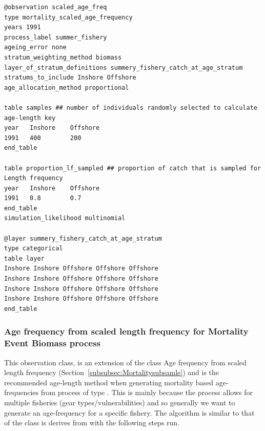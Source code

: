 {\small{\begin{verbatim}
@observation scaled_age_freq
type mortality_scaled_age_frequency
years 1991
process_label summer_fishery
ageing_error none
stratum_weighting_method biomass
layer_of_stratum_definitions summery_fishery_catch_at_age_stratum
stratums_to_include Inshore Offshore
age_allocation_method proportional

table samples ## number of individuals randomly selected to calculate age-length key
year   Inshore    Offshore
1991   400        200
end_table

table proportion_lf_sampled ## proportion of catch that is sampled for Length frequency
year   Inshore    Offshore
1991   0.8        0.7
end_table
simulation_likelihood multinomial

@layer summery_fishery_catch_at_age_stratum
type categorical
table layer 
Inshore Inshore Offshore Offshore Offshore
Inshore Inshore Offshore Offshore Offshore
Inshore Inshore Offshore Offshore Offshore
Inshore Inshore Offshore Offshore Offshore
end_table
\end{verbatim}}}


\subsubsection{Age frequency from scaled length frequency for Mortality Event Biomass process}\label{subsubsec:MortalityEventBiomasssubsamle}
This observation class, is an extension of the class Age frequency from scaled length frequency (Section~\ref{subsubsec:Mortalitysubsamle}) and is the recommended age-length method when generating mortality based age-frequencies from process of type . This is mainly because the process  allows for multiple fisheries (gear types/vulnerabilities) and so generally we want to generate an age-frequency for a specific fishery. The algorithm is similar to that of the class is derives from with the following steps run.

